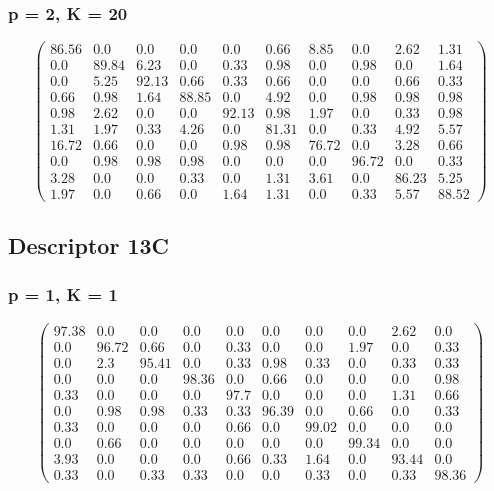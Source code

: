 \begin{appendices}
\subsubsection*{p = 2, K = 20}
$$\begin{pmatrix}
86.56&0.0&0.0&0.0&0.0&0.66&8.85&0.0&2.62&1.31\\
0.0&89.84&6.23&0.0&0.33&0.98&0.0&0.98&0.0&1.64\\
0.0&5.25&92.13&0.66&0.33&0.66&0.0&0.0&0.66&0.33\\
0.66&0.98&1.64&88.85&0.0&4.92&0.0&0.98&0.98&0.98\\
0.98&2.62&0.0&0.0&92.13&0.98&1.97&0.0&0.33&0.98\\
1.31&1.97&0.33&4.26&0.0&81.31&0.0&0.33&4.92&5.57\\
16.72&0.66&0.0&0.0&0.98&0.98&76.72&0.0&3.28&0.66\\
0.0&0.98&0.98&0.98&0.0&0.0&0.0&96.72&0.0&0.33\\
3.28&0.0&0.0&0.33&0.0&1.31&3.61&0.0&86.23&5.25\\
1.97&0.0&0.66&0.0&1.64&1.31&0.0&0.33&5.57&88.52
\end{pmatrix}$$

\subsection{Descriptor 13C}

\subsubsection*{p = 1, K = 1}
$$\begin{pmatrix}
97.38&0.0&0.0&0.0&0.0&0.0&0.0&0.0&2.62&0.0\\
0.0&96.72&0.66&0.0&0.33&0.0&0.0&1.97&0.0&0.33\\
0.0&2.3&95.41&0.0&0.33&0.98&0.33&0.0&0.33&0.33\\
0.0&0.0&0.0&98.36&0.0&0.66&0.0&0.0&0.0&0.98\\
0.33&0.0&0.0&0.0&97.7&0.0&0.0&0.0&1.31&0.66\\
0.0&0.98&0.98&0.33&0.33&96.39&0.0&0.66&0.0&0.33\\
0.33&0.0&0.0&0.0&0.66&0.0&99.02&0.0&0.0&0.0\\
0.0&0.66&0.0&0.0&0.0&0.0&0.0&99.34&0.0&0.0\\
3.93&0.0&0.0&0.0&0.66&0.33&1.64&0.0&93.44&0.0\\
0.33&0.0&0.33&0.33&0.0&0.0&0.33&0.0&0.33&98.36
\end{pmatrix}$$


\end{appendices}
